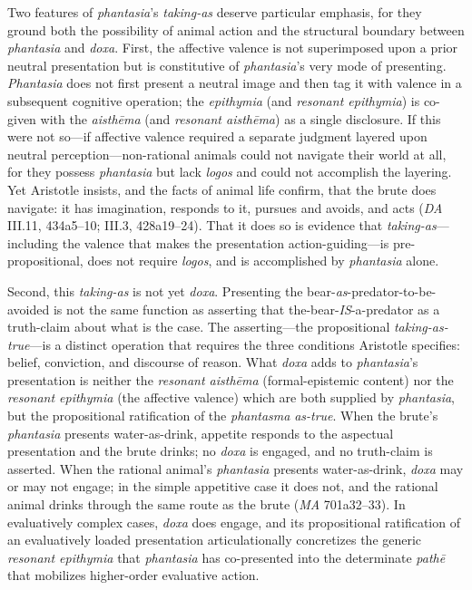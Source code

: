 \documentclass{article}
\begin{document}
Two features of \textit{phantasia}'s \textit{taking-as} deserve particular emphasis, for they ground both the possibility of animal action and the structural boundary between \textit{phantasia} and \textit{doxa}. First, the affective valence is not superimposed upon a prior neutral presentation but is constitutive of \textit{phantasia}'s very mode of presenting. \textit{Phantasia} does not first present a neutral image and then tag it with valence in a subsequent cognitive operation; the \textit{epithymia} (and \textit{resonant epithymia}) is co-given with the \textit{aisthēma} (and \textit{resonant aisthēma}) as a single disclosure. If this were not so---if affective valence required a separate judgment layered upon neutral perception---non-rational animals could not navigate their world at all, for they possess \textit{phantasia} but lack \textit{logos} and could not accomplish the layering. Yet Aristotle insists, and the facts of animal life confirm, that the brute does navigate: it has imagination, responds to it, pursues and avoids, and acts (\textit{DA} III.11, 434a5--10; III.3, 428a19--24). That it does so is evidence that \textit{taking-as}---including the valence that makes the presentation action-guiding---is pre-propositional, does not require \textit{logos}, and is accomplished by \textit{phantasia} alone.

Second, this \textit{taking-as} is not yet \textit{doxa}. Presenting the bear-\textit{as}-predator-to-be-avoided is not the same function as asserting that the-bear-\textit{IS}-a-predator as a truth-claim about what is the case. The asserting---the propositional \textit{taking-as-true}---is a distinct operation that requires the three conditions Aristotle specifies: belief, conviction, and discourse of reason. What \textit{doxa} adds to \textit{phantasia}'s presentation is neither the \textit{resonant aisthēma} (formal-epistemic content) nor the \textit{resonant epithymia} (the affective valence) which are both supplied by \textit{phantasia}, but the propositional ratification of the \textit{phantasma} \textit{as-true}. When the brute's \textit{phantasia} presents water-as-drink, appetite responds to the aspectual presentation and the brute drinks; no \textit{doxa} is engaged, and no truth-claim is asserted. When the rational animal's \textit{phantasia} presents water-as-drink, \textit{doxa} may or may not engage; in the simple appetitive case it does not, and the rational animal drinks through the same route as the brute (\textit{MA} 701a32--33). In evaluatively complex cases, \textit{doxa} does engage, and its propositional ratification of an evaluatively loaded presentation articulationally concretizes the generic \textit{resonant epithymia} that \textit{phantasia} has co-presented into the determinate \textit{pathē} that mobilizes higher-order evaluative action.
\end{document}
